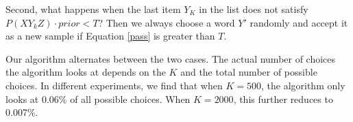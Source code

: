  Second, what happens when the last item $Y_{K}$ in the list does not satisfy $P(XY_{k}Z)\cdot prior<T$? Then we always choose a word $Y'$ randomly and accept it as a new sample if Equation \ref{pass} is greater than $T$.

 Our algorithm alternates between the two cases. The actual number of choices the algorithm looks at depends on the $K$ and the total number of possible choices. In different experiments, we find that when $K=500$, the algorithm only looks at 0.06\% of all possible choices. When $K=2000$, this further reduces to 0.007\%. 